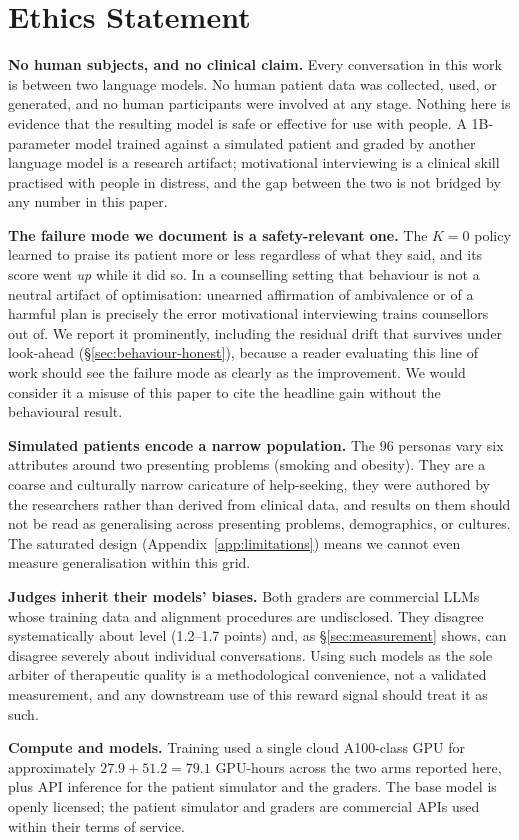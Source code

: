 \section*{Ethics Statement}

\textbf{No human subjects, and no clinical claim.} Every conversation in this work is between two
language models. No human patient data was collected, used, or generated, and no human participants
were involved at any stage. Nothing here is evidence that the resulting model is safe or effective
for use with people. A 1B-parameter model trained against a simulated patient and graded by another
language model is a research artifact; motivational interviewing is a clinical skill practised with
people in distress, and the gap between the two is not bridged by any number in this paper.

\textbf{The failure mode we document is a safety-relevant one.} The $K{=}0$ policy learned to
praise its patient more or less regardless of what they said, and its score went \emph{up} while it
did so. In a counselling setting that behaviour is not a neutral artifact of optimisation: unearned
affirmation of ambivalence or of a harmful plan is precisely the error motivational interviewing
trains counsellors out of. We report it prominently, including the residual drift that survives
under look-ahead (\S\ref{sec:behaviour-honest}), because a reader evaluating this line of work
should see the failure mode as clearly as the improvement. We would consider it a misuse of this
paper to cite the headline gain without the behavioural result.

\textbf{Simulated patients encode a narrow population.} The 96 personas vary six attributes around
two presenting problems (smoking and obesity). They are a coarse and culturally narrow caricature
of help-seeking, they were authored by the researchers rather than derived from clinical data, and
results on them should not be read as generalising across presenting problems, demographics, or
cultures. The saturated design (Appendix~\ref{app:limitations}) means we cannot even measure
generalisation within this grid.

\textbf{Judges inherit their models' biases.} Both graders are commercial LLMs whose training data
and alignment procedures are undisclosed. They disagree systematically about level (1.2--1.7
points) and, as \S\ref{sec:measurement} shows, can disagree severely about individual
conversations. Using such models as the sole arbiter of therapeutic quality is a methodological
convenience, not a validated measurement, and any downstream use of this reward signal should treat
it as such.

\textbf{Compute and models.} Training used a single cloud A100-class GPU for approximately
$27.9 + 51.2 = 79.1$ GPU-hours across the two arms reported here, plus API inference for the
patient simulator and the graders. The base model is openly licensed; the patient simulator and
graders are commercial APIs used within their terms of service.
